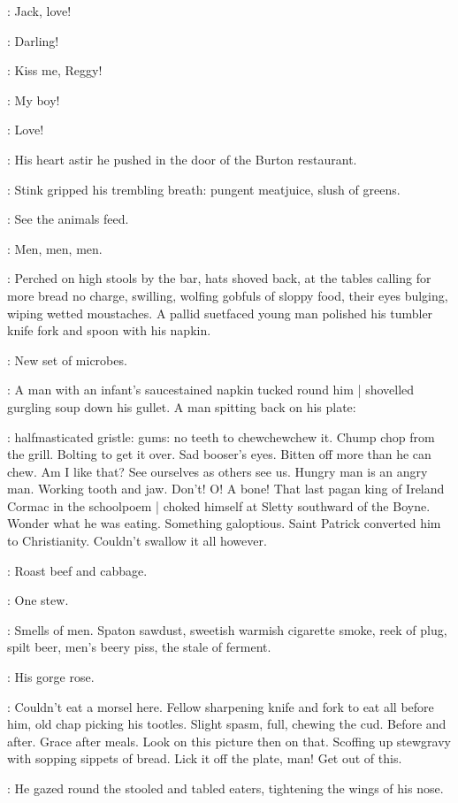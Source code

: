 :
Jack,
love!

:
Darling!

:
Kiss me,
Reggy!

:
My boy!

:
Love!

:
His heart astir
he pushed in the door of the Burton restaurant.

:
Stink gripped his trembling breath:
pungent meatjuice, slush of greens.

\BloomInt:
See the animals feed.

\BloomInt:
Men, men, men.

:
Perched on high stools by the bar,
hats shoved back,
at the tables calling for more bread no charge,
swilling,
wolfing gobfuls of sloppy food,
their eyes bulging,
wiping wetted moustaches.
A pallid suetfaced young man polished his tumbler knife fork and spoon with his napkin.

\BloomInt:
New set of microbes.

:
A man with an infant's saucestained napkin tucked round him |
shovelled gurgling soup down his gullet.
A man spitting back on his plate:

\BloomInt:
halfmasticated gristle:
gums:
no teeth to chewchewchew it.
Chump chop from the grill.
Bolting to get it over.
Sad booser's eyes.
Bitten off more than he can chew.
Am I like that?
See ourselves as others see us.
Hungry man is an angry man.
Working tooth and jaw.
Don't!
O! A bone!
That last pagan king of Ireland Cormac in the schoolpoem |
choked himself at Sletty southward of the Boyne.
Wonder what he was eating.
Something galoptious.
Saint Patrick converted him to Christianity.
Couldn't swallow it all however.

:
Roast beef and cabbage.

:
One stew.

\BloomInt:
Smells of men.
Spaton sawdust,
sweetish warmish cigarette smoke,
reek of plug, spilt beer,
men's beery piss,
the stale of ferment.

:
His gorge rose.

\BloomInt:
Couldn't eat a morsel here.
Fellow sharpening knife and fork to eat all before him,
old chap picking his tootles.
Slight spasm, full, chewing the cud.
Before and after.
Grace after meals.
Look on this picture then on that.
Scoffing up stewgravy with sopping sippets of bread.
Lick it off the plate, man!
Get out of this.

:
He gazed round the stooled and tabled eaters,
tightening the wings of his nose.

